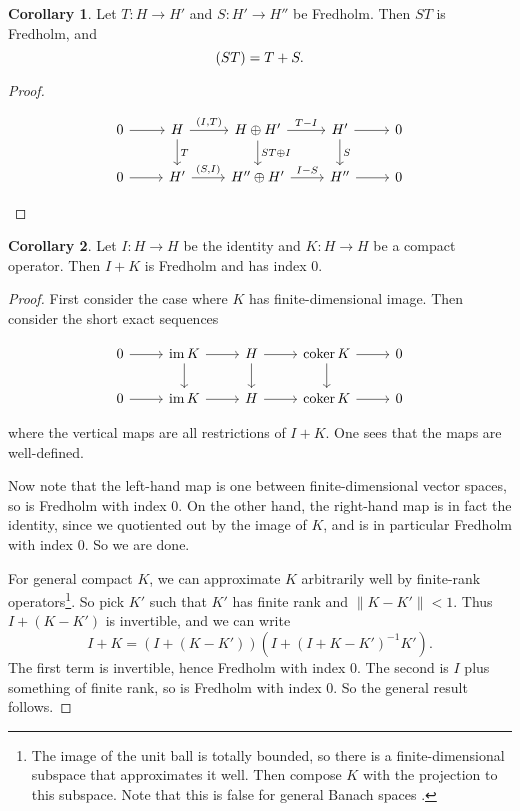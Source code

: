 \documentclass{shortart}
\theoremstyle{definition}
\newtheorem*{cor}{Corollary}
\let\index\relax %
\DeclareMathOperator{\coker}{coker}
\DeclareMathOperator{\index}{idx}
\DeclareMathOperator{\im}{im}
\newcommand\id{I}
\begin{document}
\begin{cor}
  Let $T: H \to H'$ and $S : H' \to H''$ be Fredholm. Then $ST$ is Fredholm, and
  \[
    \index (ST) = \index T + \index S.
  \]
\end{cor}

\begin{proof}
  \begin{useimager}
    \[
      \begin{tikzcd}
        0 \ar[r] & H \ar[r, "{(\id, T)}"] \ar[d, "T"] & H \oplus H' \ar[r, "T - \id"] \ar[d, "ST \oplus \id"]& H' \ar[r] \ar[d, "S"] & 0\\
        0 \ar[r] & H' \ar[r, "{(S, \id)}"] & H'' \oplus H' \ar[r, "\id - S"] & H'' \ar[r] & 0
      \end{tikzcd}\qedshift
    \]
  \end{useimager}
\end{proof}

\begin{cor}
  Let $\id: H \to H$ be the identity and $K : H \to H$ be a compact operator. Then $\id + K$ is Fredholm and has index $0$.
\end{cor}

\begin{proof}
  First consider the case where $K$ has finite-dimensional image. Then consider the short exact sequences
  \begin{useimager}
    \[
      \begin{tikzcd}
        0 \ar[r] & \im K \ar[r] \ar[d] & H \ar[r] \ar[d]& \coker K \ar[r] \ar[d] & 0\\
        0 \ar[r] & \im K \ar[r] & H \ar[r] & \coker K \ar[r] & 0
      \end{tikzcd}
    \]
  \end{useimager}
  where the vertical maps are all restrictions of $\id + K$. One sees that the maps are well-defined.

  Now note that the left-hand map is one between finite-dimensional vector spaces, so is Fredholm with index $0$. On the other hand, the right-hand map is in fact the identity, since we quotiented out by the image of $K$, and is in particular Fredholm with index $0$. So we are done.

  For general compact $K$, we can approximate $K$ arbitrarily well by finite-rank operators\footnote{The image of the unit ball is totally bounded, so there is a finite-dimensional subspace that approximates it well. Then compose $K$ with the projection to this subspace. Note that this is false for general Banach spaces \cite{enflo1973}.}. So pick $K'$ such that $K'$ has finite rank and $\|K - K'\| < 1$. Thus $\id + (K - K')$ is invertible, and we can write
  \[
    \id + K = (\id + (K - K')) (\id + (\id + K - K')^{-1} K').
  \]
  The first term is invertible, hence Fredholm with index $0$. The second is $\id$ plus something of finite rank, so is Fredholm with index $0$. So the general result follows.
\end{proof}
\end{document}

